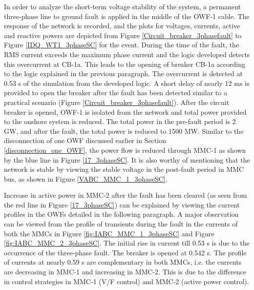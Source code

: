 In order to analyze the short-term voltage stability of the system, a permanent three-phase line to ground fault is applied in the middle of the \gls{OWF}-1 cable. The response of the network is recorded, and the plots for voltages, currents, active and reactive powers are depicted from Figure \ref{Circuit_breaker_3phasefault} to Figure \ref{IDQ_WT1_3phaseSC} for the event. During the time of the fault, the RMS current exceeds the maximum phase current and the logic developed detects this overcurrent at CB-1a. This leads to the opening of breaker CB-1a according to the logic explained in the previous paragraph. The overcurrent is detected at 0.53 s of the simulation from the developed logic. A short delay of nearly 12 ms is provided to open the breaker after the fault has been detected similar to a practical scenario (Figure \ref{Circuit_breaker_3phasefault}). After the circuit breaker is opened, \gls{OWF}-1 is isolated from the network and total power provided to the onshore system is reduced. The total power in the pre-fault period is 2 GW, and after the fault, the total power is reduced to 1500 MW. Similar to the disconnection of one \gls{OWF} discussed earlier in Section \ref{disconnection_one_OWF}, the power flow is reduced through \gls{MMC}-1 as shown by the blue line in Figure \ref{17_3phaseSC}. It is also worthy of mentioning that the network is stable by viewing the stable voltage in the post-fault period in \gls{MMC} bus, as shown in Figure \ref{VABC_MMC_1_3phaseSC}.



Increase in active power in \gls{MMC}-2 after the fault has been cleared (as seen from the red line in Figure \ref{17_3phaseSC}) can be explained by viewing the current profiles in the \gls{OWF}s detailed in the following paragraph. A major observation can be viewed from the profile of transients during the fault in the currents of both the \gls{MMC}s in Figure \ref{fig:IABC_MMC_1_3phaseSC} and Figure \ref{fig:IABC_MMC_2_3phaseSC}. The initial rise in current till 0.53 s is due to the occurrence of the three-phase fault. The breaker is opened at 0.542 s. The profile of currents at nearly 0.59 s are complementary in both \gls{MMC}s, i.e. the currents are decreasing in \gls{MMC}-1 and increasing in \gls{MMC}-2. This is due to the difference in control strategies in \gls{MMC}-1 (V/F control) and \gls{MMC}-2 (active power control).

